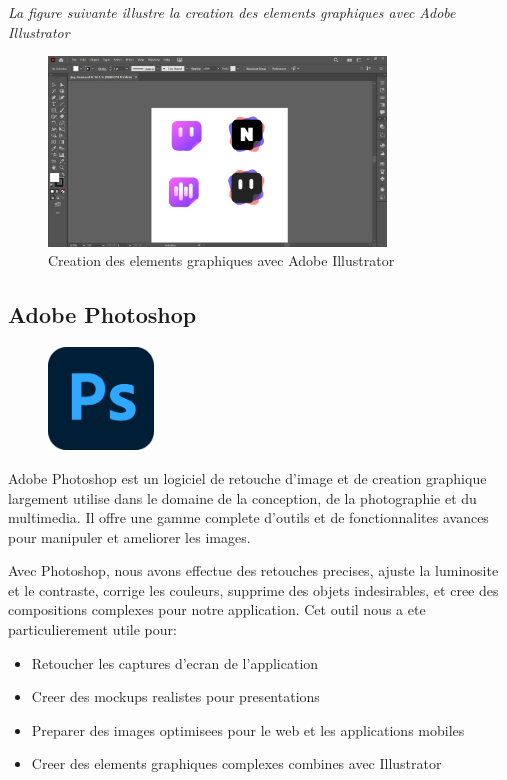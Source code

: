 \noindent
\textit{La figure suivante illustre la creation des elements graphiques avec Adobe Illustrator}
\begin{figure}[H]
\centering
\includegraphics[width=0.8\textwidth]{assets/docs/working-ulistrator.jpg}
\caption{Creation des elements graphiques avec Adobe Illustrator}
\label{fig:illustrator-assets}
\end{figure}

\subsection{Adobe Photoshop}
\begin{figure}
    \centering
    \includegraphics[width=0.25\textwidth]{assets/docs/photoshop.png}
\end{figure}
Adobe Photoshop est un logiciel de retouche d'image et de creation graphique largement utilise dans le domaine de la conception, de la photographie et du multimedia. Il offre une gamme complete d'outils et de fonctionnalites avances pour manipuler et ameliorer les images.

Avec Photoshop, nous avons effectue des retouches precises, ajuste la luminosite et le contraste, corrige les couleurs, supprime des objets indesirables, et cree des compositions complexes pour notre application. Cet outil nous a ete particulierement utile pour:

\begin{itemize}
    \item Retoucher les captures d'ecran de l'application
    \item Creer des mockups realistes pour presentations
    \item Preparer des images optimisees pour le web et les applications mobiles
    \item Creer des elements graphiques complexes combines avec Illustrator
\end{itemize}

